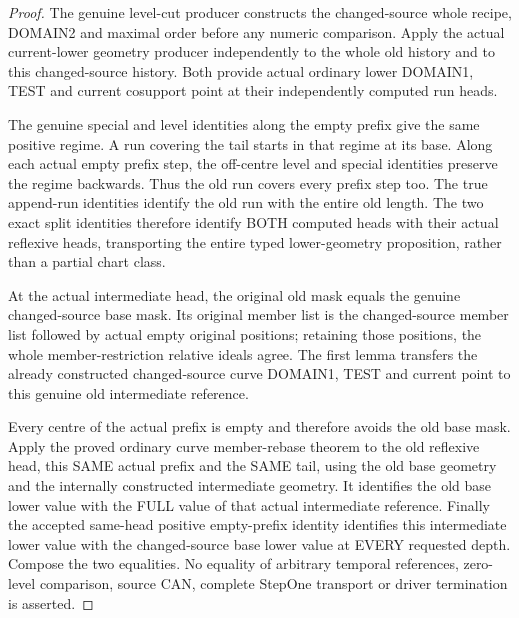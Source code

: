 \begin{proof}
The genuine level-cut producer constructs the changed-source whole recipe,
DOMAIN2 and maximal order before any numeric comparison. Apply the actual
current-lower geometry producer independently to the whole old history
and to this changed-source history. Both provide actual ordinary lower
DOMAIN1, TEST and current cosupport point at their independently computed
run heads.

The genuine special and level identities along the empty prefix give the
same positive regime. A run covering the tail starts in that regime at its
base. Along each actual empty prefix step, the off-centre level and special
identities preserve the regime backwards. Thus the old run covers every
prefix step too. The true append-run identities identify the old run with
the entire old length. The two exact split identities therefore identify
BOTH computed heads with their actual reflexive heads, transporting the
entire typed lower-geometry proposition, rather than a partial chart class.

At the actual intermediate head, the original old mask equals the genuine
changed-source base mask. Its original member list is the changed-source
member list followed by actual empty original positions; retaining those
positions, the whole member-restriction relative ideals agree. The first
lemma transfers the already constructed changed-source curve DOMAIN1,
TEST and current point to this genuine old intermediate reference.

Every centre of the actual prefix is empty and therefore avoids the old
base mask. Apply the proved ordinary curve member-rebase theorem to the
old reflexive head, this SAME actual prefix and the SAME tail, using the
old base geometry and the internally constructed intermediate geometry.
It identifies the old base lower value with the FULL value of that actual
intermediate reference. Finally the accepted same-head positive empty-prefix
identity identifies this intermediate lower value with the changed-source
base lower value at EVERY requested depth. Compose the two equalities.
No equality of arbitrary temporal references, zero-level comparison,
source CAN, complete StepOne transport or driver termination is asserted.
\end{proof}
